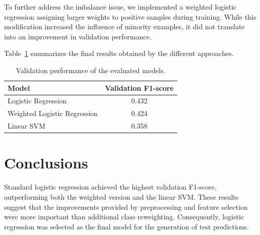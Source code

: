 \documentclass[10pt,a4paper,twocolumn]{article}
\begin{document}
To further address the imbalance issue, we implemented a weighted logistic regression assigning larger weights to positive samples during training.
While this modification increased the influence of minority examples, it did not translate into an improvement in validation performance.

Table~\ref{tab:results} summarizes the final results obtained by the different approaches.

\begin{table}[t]
    \centering
    \begin{tabular}{lc}
        \toprule
        Model & Validation F1-score \\
        \midrule
        Logistic Regression & 0.432 \\
        Weighted Logistic Regression & 0.424 \\
        Linear SVM & 0.358 \\
        \bottomrule
    \end{tabular}
    \caption{Validation performance of the evaluated models.}
    \label{tab:results}
\end{table}

\section{Conclusions}

Standard logistic regression achieved the highest validation F1-score, outperforming both the weighted version and the linear SVM.
These results suggest that the improvements provided by preprocessing and feature selection were more important than additional class reweighting.
Consequently, logistic regression was selected as the final model for the generation of test predictions.
\end{document}
